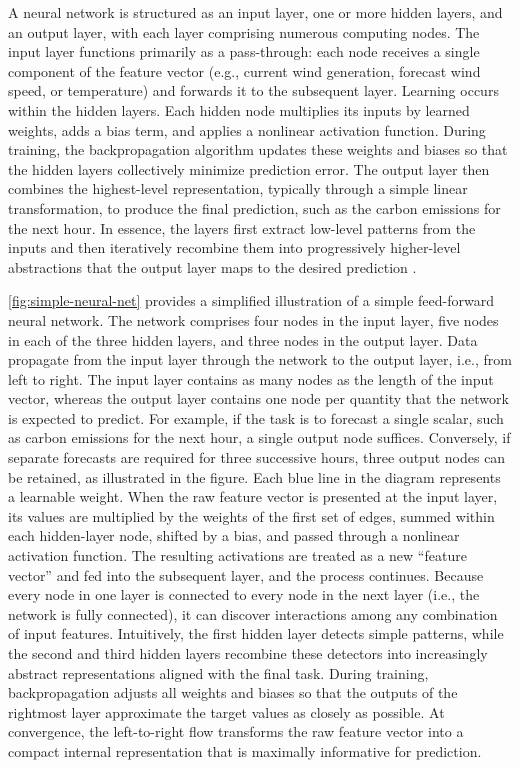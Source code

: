 A neural network is structured as an input layer, one or more hidden layers, and an output layer, with each layer comprising numerous computing nodes. The input layer functions primarily as a pass-through: each node receives a single component of the feature vector (e.g., current wind generation, forecast wind speed, or temperature) and forwards it to the subsequent layer. Learning occurs within the hidden layers. Each hidden node multiplies its inputs by learned weights, adds a bias term, and applies a nonlinear activation function. During training, the backpropagation algorithm updates these weights and biases so that the hidden layers collectively minimize prediction error. The output layer then combines the highest-level representation, typically through a simple linear transformation, to produce the final prediction, such as the carbon emissions for the next hour. In essence, the layers first extract low-level patterns from the inputs and then iteratively recombine them into progressively higher-level abstractions that the output layer maps to the desired prediction \parencite{goodfellow2016}.



\autoref{fig:simple-neural-net} provides a simplified illustration of a simple feed-forward neural network. The network comprises four nodes in the input layer, five nodes in each of the three hidden layers, and three nodes in the output layer. Data propagate from the input layer through the network to the output layer, i.e., from left to right. The input layer contains as many nodes as the length of the input vector, whereas the output layer contains one node per quantity that the network is expected to predict. For example, if the task is to forecast a single scalar, such as carbon emissions for the next hour, a single output node suffices. Conversely, if separate forecasts are required for three successive hours, three output nodes can be retained, as illustrated in the figure. Each blue line in the diagram represents a learnable weight. When the raw feature vector is presented at the input layer, its values are multiplied by the weights of the first set of edges, summed within each hidden-layer node, shifted by a bias, and passed through a nonlinear activation function. The resulting activations are treated as a new ``feature vector'' and fed into the subsequent layer, and the process continues. Because every node in one layer is connected to every node in the next layer (i.e., the network is fully connected), it can discover interactions among any combination of input features. Intuitively, the first hidden layer detects simple patterns, while the second and third hidden layers recombine these detectors into increasingly abstract representations aligned with the final task. During training, backpropagation adjusts all weights and biases so that the outputs of the rightmost layer approximate the target values as closely as possible. At convergence, the left-to-right flow transforms the raw feature vector into a compact internal representation that is maximally informative for prediction.

